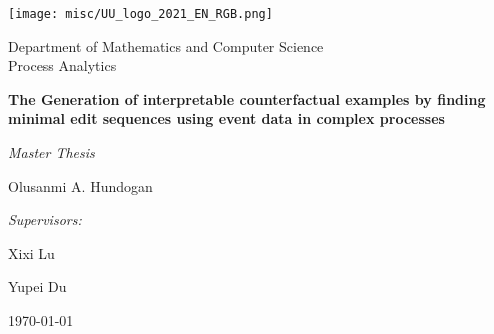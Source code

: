 \documentclass[./../paper.tex]{subfiles}
\begin{document}
\begin{titlepage}
    \centering
    \texttt{[image: misc/UU\_logo\_2021\_EN\_RGB.png]}\par
    Department of Mathematics and Computer Science\\
    Process Analytics

    \vspace{3cm}
    {\LARGE\textbf{The Generation of interpretable counterfactual examples by finding minimal edit sequences using event data in complex processes}}\par\vspace{0.5cm}
    {\large\textit{Master Thesis}}\par\vspace{1cm}
    {\large Olusanmi A. Hundogan}\par

    \vfill

    \emph{Supervisors:}\par
    Xixi Lu\par
    Yupei Du\par

    \today
    \vspace{2cm}


\end{titlepage}
\end{document}
